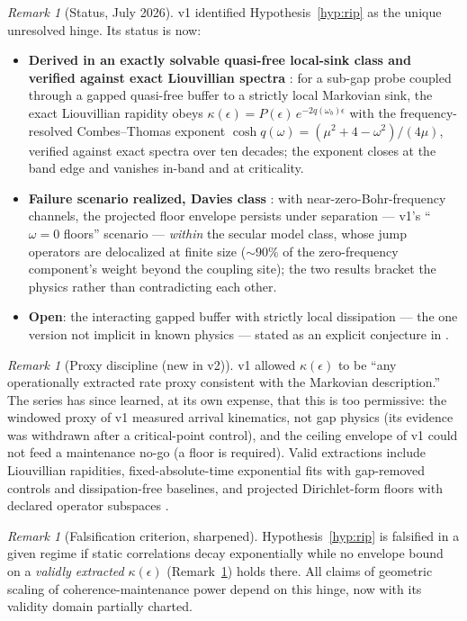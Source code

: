 \documentclass[11pt,a4paper]{article}
\theoremstyle{plain}
\theoremstyle{definition}
\theoremstyle{remark}
\newtheorem{remark}[theorem]{Remark}
\begin{document}
\begin{remark}[Status, July 2026]\label{rem:status}
v1 identified Hypothesis~\ref{hyp:rip} as the unique unresolved hinge. Its
status is now:
\begin{itemize}
\item \textbf{Derived in an exactly solvable quasi-free local-sink class and
verified against exact Liouvillian spectra} \cite{HCut}: for a sub-gap
probe coupled through a gapped quasi-free buffer to a strictly local Markovian
sink, the exact Liouvillian rapidity obeys $\kappa(\epsilon) =
P(\epsilon)\,e^{-2q(\omega_b)\epsilon}$ with the frequency-resolved
Combes--Thomas exponent $\cosh q(\omega) = (\mu^2 + 4 - \omega^2)/(4\mu)$,
verified against exact spectra over ten decades; the exponent closes at the
band edge and vanishes in-band and at criticality.
\item \textbf{Failure scenario realized, Davies class} \cite{Stress}: with
near-zero-Bohr-frequency channels, the projected floor envelope persists under
separation --- v1's ``$\omega = 0$ floors'' scenario --- \emph{within} the
secular model class, whose jump operators are delocalized at finite size
($\sim 90\%$ of the zero-frequency component's weight beyond the coupling
site); the two results bracket the physics rather than contradicting each
other.
\item \textbf{Open}: the interacting gapped buffer with strictly local
dissipation --- the one version not implicit in known physics --- stated as an
explicit conjecture in \cite{HCut}.
\end{itemize}
\end{remark}

\begin{remark}[Proxy discipline (new in v2)]\label{rem:proxy}
v1 allowed $\kappa(\epsilon)$ to be ``any operationally extracted rate proxy
consistent with the Markovian description.'' The series has since learned, at
its own expense, that this is too permissive: the windowed proxy of
\cite{HCut} v1 measured arrival kinematics, not gap physics (its evidence was
withdrawn after a critical-point control), and the ceiling envelope of
\cite{Stress} v1 could not feed a maintenance no-go (a floor is required).
Valid extractions include Liouvillian rapidities, fixed-absolute-time
exponential fits with gap-removed controls and dissipation-free baselines, and
projected Dirichlet-form floors with declared operator subspaces
\cite{HCut,Stress}.
\end{remark}

\begin{remark}[Falsification criterion, sharpened]
Hypothesis~\ref{hyp:rip} is falsified in a given regime if static correlations
decay exponentially while no envelope bound on a \emph{validly extracted}
$\kappa(\epsilon)$ (Remark~\ref{rem:proxy}) holds there. All claims of
geometric scaling of coherence-maintenance power depend on this hinge, now
with its validity domain partially charted.
\end{remark}
\end{document}
